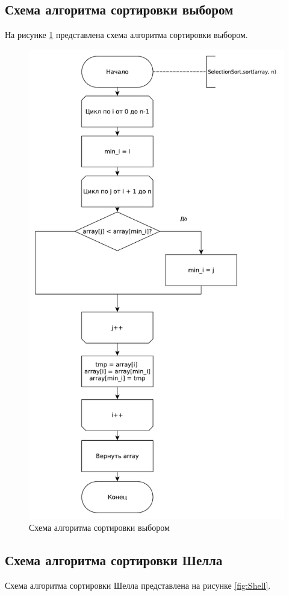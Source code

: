 \documentclass[a4paper,oneside,14pt]{extreport}
\begin{document}
\subsection{Схема алгоритма сортировки выбором}
На рисунке \ref{fig:Selection} представлена схема алгоритма сортировки выбором.

\captionsetup{justification=centering, singlelinecheck=false}

\begin{figure}[H]
	\centering
	\includegraphics[width=0.8\linewidth]{images/SelectionSort}
	\caption{Схема алгоритма сортировки выбором}
	\label{fig:Selection}
\end{figure}

\subsection{Схема алгоритма сортировки Шелла}
Схема алгоритма сортировки Шелла представлена на рисунке \ref{fig:Shell}.
\end{document}
